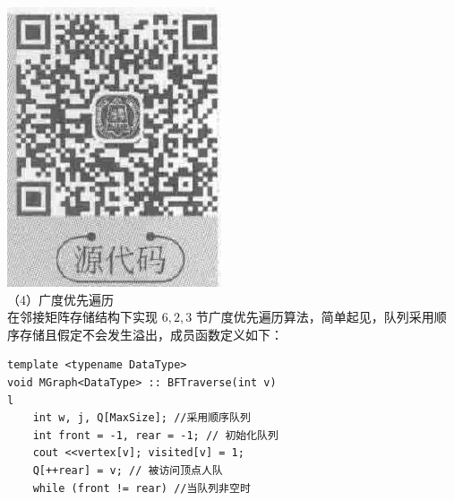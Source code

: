 \documentclass[10pt]{article}
\begin{document}
\includegraphics[max width=\textwidth, center]{2025_06_06_704745ea57b15b2333e5g-194}\\
（4）广度优先遍历\\
在邻接矩阵存储结构下实现 $6,2,3$ 节广度优先遍历算法，简单起见，队列采用顺序存储且假定不会发生溢出，成员函数定义如下：

\begin{verbatim}
template <typename DataType>
void MGraph<DataType> :: BFTraverse(int v)
l
    int w, j, Q[MaxSize]; //采用顺序队列
    int front = -1, rear = -1; // 初始化队列
    cout <<vertex[v]; visited[v] = 1;
    Q[++rear] = v; // 被访问顶点人队
    while (front != rear) //当队列非空时
\end{verbatim}
\end{document}
